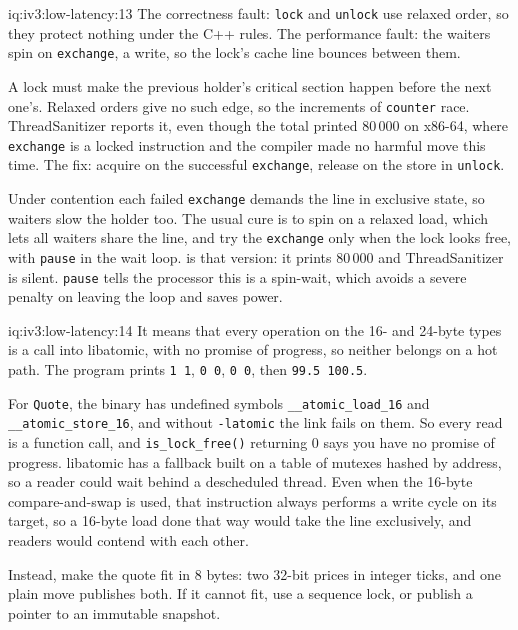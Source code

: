 \begin{solution}{iq:iv3:low-latency:13}
The correctness fault: \texttt{lock} and \texttt{unlock} use relaxed order, so they protect nothing under the C++ rules. The performance fault: the waiters spin on \texttt{exchange}, a write, so the lock's cache line bounces between them.

A lock must make the previous holder's critical section happen before the next one's. Relaxed orders give no such edge, so the increments of \texttt{counter} race. ThreadSanitizer reports it, even though the total printed 80\,000 on x86-64, where \texttt{exchange} is a locked instruction and the compiler made no harmful move this time. The fix: acquire on the successful \texttt{exchange}, release on the store in \texttt{unlock}.

Under contention each failed \texttt{exchange} demands the line in exclusive state, so waiters slow the holder too. The usual cure is to spin on a relaxed load, which lets all waiters share the line, and try the \texttt{exchange} only when the lock looks free, with \texttt{pause} in the wait loop.  is that version: it prints 80\,000 and ThreadSanitizer is silent. \texttt{pause} tells the processor this is a spin-wait, which avoids a severe penalty on leaving the loop and saves power.
\label{lst:iv3:ll:ttas}
\end{solution}

\begin{solution}{iq:iv3:low-latency:14}
It means that every operation on the 16- and 24-byte types is a call into libatomic, with no promise of progress, so neither belongs on a hot path. The program prints \texttt{1 1}, \texttt{0 0}, \texttt{0 0}, then \texttt{99.5 100.5}.

For \texttt{Quote}, the binary has undefined symbols \texttt{\_\_atomic\_load\_16} and \texttt{\_\_atomic\_store\_16}, and without \texttt{-latomic} the link fails on them. So every read is a function call, and \texttt{is\_lock\_free()} returning 0 says you have no promise of progress. libatomic has a fallback built on a table of mutexes hashed by address, so a reader could wait behind a descheduled thread. Even when the 16-byte compare-and-swap is used, that instruction always performs a write cycle on its target, so a 16-byte load done that way would take the line exclusively, and readers would contend with each other.

Instead, make the quote fit in 8 bytes: two 32-bit prices in integer ticks, and one plain move publishes both. If it cannot fit, use a sequence lock, or publish a pointer to an immutable snapshot.

\end{solution}

